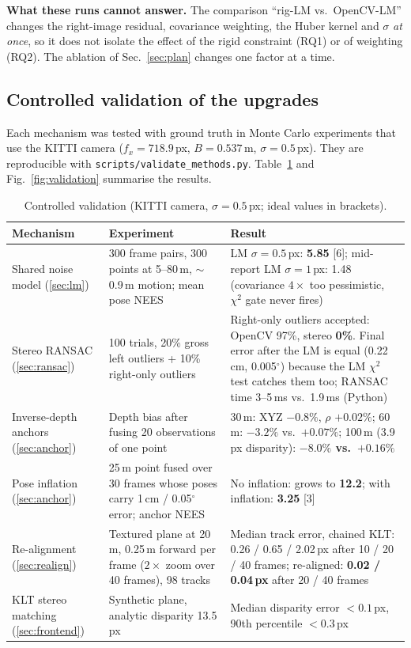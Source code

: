 \documentclass[11pt,a4paper]{article}
\begin{document}
\textbf{What these runs cannot answer.} The comparison ``rig-LM vs.\ OpenCV-LM'' changes the right-image residual, covariance weighting, the Huber kernel and $\sigma$ \emph{at once}, so it does not isolate the effect of the rigid constraint (RQ1) or of weighting (RQ2). The ablation of Sec.~\ref{sec:plan} changes one factor at a time.

\subsection{Controlled validation of the upgrades}\label{sec:validation}
Each mechanism was tested with ground truth in Monte Carlo experiments that use the KITTI camera ($f_x = 718.9$\,px, $B = 0.537$\,m, $\sigma = 0.5$\,px). They are reproducible with \texttt{scripts/validate\_methods.py}. Table~\ref{tab:validation} and Fig.~\ref{fig:validation} summarise the results.

\begin{table}[t]
\centering\scriptsize\setlength{\tabcolsep}{4pt}
\caption{Controlled validation (KITTI camera, $\sigma = 0.5$\,px; ideal values in brackets).}\label{tab:validation}
\vspace{-0.2cm}
\begin{tabular}{p{3.3cm}p{6.0cm}p{6.6cm}}
\toprule
Mechanism & Experiment & Result \\
\midrule
Shared noise model (\ref{sec:lm}) & 300 frame pairs, 300 points at 5--80\,m, $\sim$0.9\,m motion; mean pose NEES & LM $\sigma = 0.5$\,px: \textbf{5.85} [6]; mid-report LM $\sigma = 1$\,px: 1.48 (covariance $4\times$ too pessimistic, $\chi^2$ gate never fires) \\
Stereo RANSAC (\ref{sec:ransac}) & 100 trials, 20\% gross left outliers + 10\% right-only outliers & Right-only outliers accepted: OpenCV 97\%, stereo \textbf{0\%}. Final error after the LM is equal (0.22\,cm, 0.005$^\circ$) because the LM $\chi^2$ test catches them too; RANSAC time 3--5\,ms vs.\ 1.9\,ms (Python) \\
Inverse-depth anchors (\ref{sec:anchor}) & Depth bias after fusing 20 observations of one point & 30\,m: XYZ $-0.8\%$, $\rho$ $+0.02\%$; 60\,m: $-3.2\%$ vs.\ $+0.07\%$; 100\,m (3.9\,px disparity): \textbf{$-8.0\%$ vs.\ $+0.16\%$} \\
Pose inflation (\ref{sec:anchor}) & 25\,m point fused over 30 frames whose poses carry 1\,cm / 0.05$^\circ$ error; anchor NEES & No inflation: grows to \textbf{12.2}; with inflation: \textbf{3.25} [3] \\
Re-alignment (\ref{sec:realign}) & Textured plane at 20\,m, 0.25\,m forward per frame ($2\times$ zoom over 40 frames), 98 tracks & Median track error, chained KLT: 0.26 / 0.65 / 2.02\,px after 10 / 20 / 40 frames; re-aligned: \textbf{0.02 / 0.04\,px} after 20 / 40 frames \\
KLT stereo matching (\ref{sec:frontend}) & Synthetic plane, analytic disparity 13.5\,px & Median disparity error $< 0.1$\,px, 90th percentile $< 0.3$\,px \\
\bottomrule
\end{tabular}
\vspace{-0.3cm}
\end{table}
\end{document}
